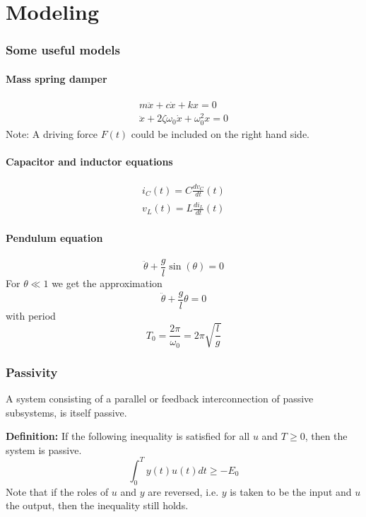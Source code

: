 \part{Modeling}
\section{Some useful models}
\subsection{Mass spring damper}
\begin{align}
    m\ddot{x} + c\dot{x} + kx = 0\\
    \ddot{x} + 2\zeta \omega_0 \dot{x} + \omega_0^2 x = 0
\end{align}
Note: A driving force $F(t)$ could be included on the right hand side.

\subsection{Capacitor and inductor equations}
\begin{align}
    i_C(t) = C\frac{dv_C}{dt}(t)\\
    v_L(t) = L\frac{di_L}{dt}(t)
\end{align}

\subsection{Pendulum equation}
\begin{equation}
    \ddot{\theta} + \frac{g}{l} \sin(\theta) = 0
\end{equation}
For $\theta \ll 1$ we get the approximation
\begin{equation}
    \ddot{\theta} + \frac{g}{l}\theta = 0
\end{equation}
with period
\begin{equation}
    T_0 = \frac{2\pi}{\omega_0} = 2\pi \sqrt{\frac{l}{g}}
\end{equation}

\section{Passivity}
A system consisting of a parallel or feedback interconnection of passive subsystems, is itself passive.

\textbf{Definition:} If the following inequality is satisfied for all $u$ and $T \geq 0$, then the system is passive.
\begin{equation}
    \int_0^T y(t)u(t)dt \geq -E_0
\end{equation}
Note that if the roles of $u$ and $y$ are reversed, i.e. $y$ is taken to be the input and $u$ the output, then the inequality still holds.

